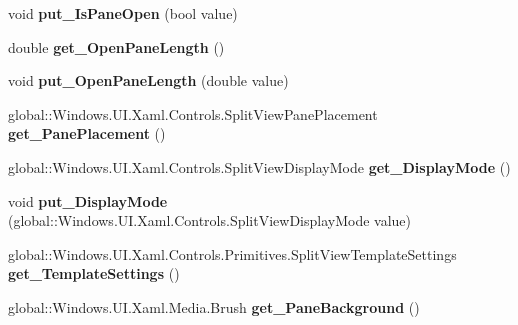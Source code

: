 \begin{DoxyCompactItemize}
void {\bfseries put\+\_\+\+Is\+Pane\+Open} (bool value)
\item 
\mbox{\label{interface_windows_1_1_u_i_1_1_xaml_1_1_controls_1_1_i_split_view_a99f8d7f7c0235d00bf56e1224ea0410c}} 
double {\bfseries get\+\_\+\+Open\+Pane\+Length} ()
\item 
\mbox{\label{interface_windows_1_1_u_i_1_1_xaml_1_1_controls_1_1_i_split_view_a92b1399298c0fd5087100c36bd7fe8f5}} 
void {\bfseries put\+\_\+\+Open\+Pane\+Length} (double value)
\item 
\mbox{\label{interface_windows_1_1_u_i_1_1_xaml_1_1_controls_1_1_i_split_view_ab795867716cdcc78c0ee7c7f7cdb8a70}} 
global\+::\+Windows.\+U\+I.\+Xaml.\+Controls.\+Split\+View\+Pane\+Placement {\bfseries get\+\_\+\+Pane\+Placement} ()
\item 
\mbox{\label{interface_windows_1_1_u_i_1_1_xaml_1_1_controls_1_1_i_split_view_a5c6b5fd189586ae6a4809f2028b036e9}} 
global\+::\+Windows.\+U\+I.\+Xaml.\+Controls.\+Split\+View\+Display\+Mode {\bfseries get\+\_\+\+Display\+Mode} ()
\item 
\mbox{\label{interface_windows_1_1_u_i_1_1_xaml_1_1_controls_1_1_i_split_view_a31d4c4574b734f77622f95bc78b04c1a}} 
void {\bfseries put\+\_\+\+Display\+Mode} (global\+::\+Windows.\+U\+I.\+Xaml.\+Controls.\+Split\+View\+Display\+Mode value)
\item 
\mbox{\label{interface_windows_1_1_u_i_1_1_xaml_1_1_controls_1_1_i_split_view_a5d410ee30d731de0a395a350b650dabb}} 
global\+::\+Windows.\+U\+I.\+Xaml.\+Controls.\+Primitives.\+Split\+View\+Template\+Settings {\bfseries get\+\_\+\+Template\+Settings} ()
\item 
\mbox{\label{interface_windows_1_1_u_i_1_1_xaml_1_1_controls_1_1_i_split_view_a1c78e9b7f929fa0f024bfd75bd93b2b3}} 
global\+::\+Windows.\+U\+I.\+Xaml.\+Media.\+Brush {\bfseries get\+\_\+\+Pane\+Background} ()

\end{DoxyCompactItemize}

